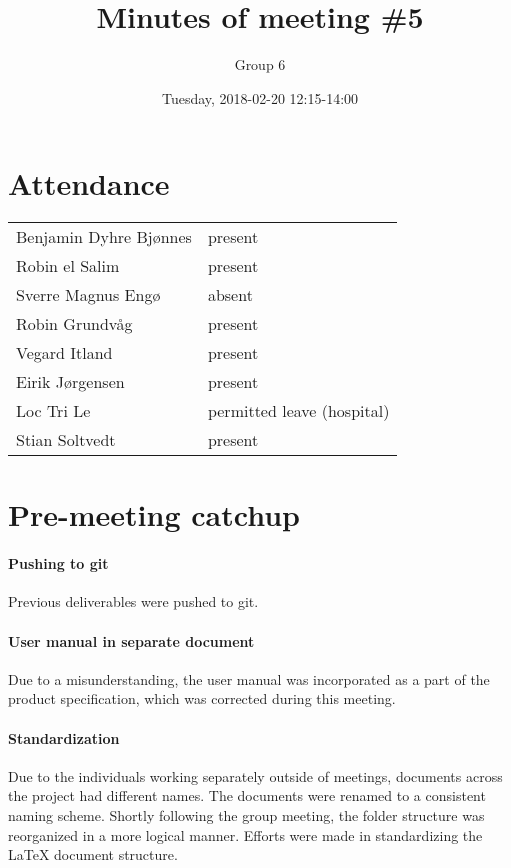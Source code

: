 \documentclass{article}
\title{Minutes of meeting \#5}
\author{Group 6}
\date{Tuesday, 2018-02-20 12:15-14:00}
\begin{document}
\maketitle

\section{Attendance}
\begin{tabular}{l l}
    Benjamin Dyhre Bjønnes     & present \\
    Robin el Salim             & present \\
    Sverre Magnus Engø         & absent \\
    Robin Grundvåg             & present \\
    Vegard Itland              & present \\
    Eirik Jørgensen            & present \\
    Loc Tri Le                 & permitted leave (hospital) \\
    Stian Soltvedt             & present
\end{tabular}

\section{Pre-meeting catchup}

\paragraph{Pushing to git}

Previous deliverables were pushed to git.

\paragraph{User manual in separate document}

Due to a misunderstanding, the user manual was incorporated as a part of the product specification, which was corrected during this meeting.

\paragraph{Standardization}

Due to the individuals working separately outside of meetings, documents across the project had different names. The documents were renamed to a consistent naming scheme. Shortly following the group meeting, the folder structure was reorganized in a more logical manner. Efforts were made in standardizing the LaTeX document structure.
\end{document}
